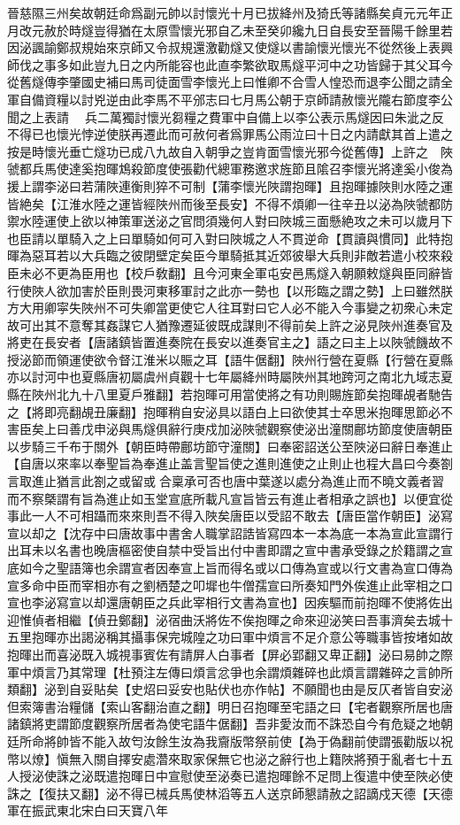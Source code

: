 晉慈隰三州矣故朝廷命爲副元帥以討懷光十月已拔絳州及猗氏等諸縣矣貞元元年正月改元赦於時燧豈得猶在太原雪懷光邪自乙未至癸卯纔九日自長安至晉陽千餘里若因泌諷諭鄭叔規始來京師又令叔規還激勸燧又使燧以書諭懷光懷光不從然後上表興師伐之事多如此豈九日之内所能容也此直李繁欲取馬燧平河中之功皆歸于其父耳今從舊燧傳李肇國史補曰馬司徒面雪李懷光上曰惟卿不合雪人惶恐而退李公聞之請全軍自備資糧以討兇逆由此李馬不平邠志曰七月馬公朝于京師請赦懷光隴右節度李公聞之上表請　兵二萬獨討懷光芻糧之費軍中自備上以李公表示馬燧因曰朱泚之反不得已也懷光悖逆使朕再遷此而可赦何者爲罪馬公雨泣曰十日之内請獻其首上遣之按是時懷光垂亡燧功已成八九故自入朝爭之豈肯面雪懷光邪今從舊傳】上許之　陜虢都兵馬使達奚抱暉鴆殺節度使張勸代總軍務邀求旌節且隂召李懷光將達奚小俊為援上謂李泌曰若蒲陜連衡則猝不可制【蒲李懷光陜謂抱暉】且抱暉據陜則水陸之運皆絶矣【江淮水陸之運皆經陜州而後至長安】不得不煩卿一往辛丑以泌為陜虢都防禦水陸運使上欲以神策軍送泌之官問須幾何人對曰陜城三面懸絶攻之未可以歲月下也臣請以單騎入之上曰單騎如何可入對曰陜城之人不貫逆命【貫讀與慣同】此特抱暉為惡耳若以大兵臨之彼閉壁定矣臣今單騎抵其近郊彼舉大兵則非敵若遣小校來殺臣未必不更為臣用也【校戶敎翻】且今河東全軍屯安邑馬燧入朝願敕燧與臣同辭皆行使陜人欲加害於臣則畏河東移軍討之此亦一勢也【以形臨之謂之勢】上曰雖然朕方大用卿寜失陜州不可失卿當更使它人往耳對曰它人必不能入今事變之初衆心未定故可出其不意奪其姦謀它人猶豫遷延彼既成謀則不得前矣上許之泌見陜州進奏官及將吏在長安者【唐諸鎮皆置進奏院在長安以進奏官主之】語之曰主上以陜虢饑故不授泌節而領運使欲令督江淮米以賑之耳【語牛倨翻】陜州行營在夏縣【行營在夏縣亦以討河中也夏縣唐初屬虞州貞觀十七年屬絳州時屬陜州其地跨河之南北九域志夏縣在陜州北九十八里夏戶雅翻】若抱暉可用當使將之有功則賜旌節矣抱暉覘者馳告之【將即亮翻覘丑廉翻】抱暉稍自安泌具以語白上曰欲使其士卒思米抱暉思節必不害臣矣上曰善戊申泌與馬燧俱辭行庚戍加泌陜虢觀察使泌出潼關鄜坊節度使唐朝臣以步騎三千布于關外【朝臣時帶鄜坊節守潼關】曰奉密詔送公至陜泌曰辭日奉進止【自唐以來率以奉聖旨為奉進止盖言聖旨使之進則進使之止則止也程大昌曰今奏劄言取進止猶言此劄之或留或合稟承可否也唐中葉遂以處分為進止而不曉文義者習而不察槩謂有旨為進止如玉堂宣底所載凡宣旨皆云有進止者相承之誤也】以便宜從事此一人不可相躡而來來則吾不得入陜矣唐臣以受詔不敢去【唐臣當作朝臣】泌寫宣以却之【沈存中曰唐故事中書舍人職掌詔誥皆寫四本一本為底一本為宣此宣謂行出耳未以名書也晚唐樞密使自禁中受旨出付中書即謂之宣中書承受錄之於籍謂之宣底如今之聖語簿也余謂宣者因奉宣上旨而得名或以口傳為宣或以行文書為宣口傳為宣多命中臣而宰相亦有之劉栖楚之叩墀也牛僧孺宣曰所奏知門外俟進止此宰相之口宣也李泌寫宣以却還唐朝臣之兵此宰相行文書為宣也】因疾驅而前抱暉不使將佐出迎惟偵者相繼【偵丑鄭翻】泌宿曲沃將佐不俟抱暉之命來迎泌笑曰吾事濟矣去城十五里抱暉亦出謁泌稱其攝事保完城隍之功曰軍中煩言不足介意公等職事皆按堵如故抱暉出而喜泌既入城視事賓佐有請屏人白事者【屏必郢翻又卑正翻】泌曰易帥之際軍中煩言乃其常理【杜預注左傳曰煩言忿爭也余謂煩雜碎也此煩言謂雜碎之言帥所類翻】泌到自妥貼矣【史炤曰妥安也貼伏也亦作帖】不願聞也由是反仄者皆自安泌但索簿書治糧儲【索山客翻治直之翻】明日召抱暉至宅語之曰【宅者觀察所居也唐諸鎮將吏謂節度觀察所居者為使宅語牛倨翻】吾非愛汝而不誅恐自今有危疑之地朝廷所命將帥皆不能入故匄汝餘生汝為我齎版幣祭前使【為于偽翻前使謂張勸版以祝幣以燎】愼無入關自擇安處濳來取家保無它也泌之辭行也上籍陜將預于亂者七十五人授泌使誅之泌既遣抱暉日中宣慰使至泌奏已遣抱暉餘不足問上復遣中使至陜必使誅之【復扶又翻】泌不得已械兵馬使林滔等五人送京師懇請赦之詔謫戍天德【天德軍在振武東北宋白曰天寶八年